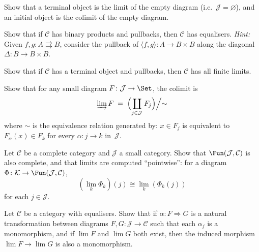 \begin{exercise}\label{exer:terminal-limit}
Show that a terminal object is the limit of the empty diagram
(i.e.\ $\mathcal{J} = \varnothing$), and an initial object is the
colimit of the empty diagram.
\end{exercise}

\begin{exercise}\label{exer:equaliser-from-pullback}
Show that if $\mathcal{C}$ has binary products and pullbacks,
then $\mathcal{C}$ has equalisers.
\emph{Hint:} Given $f,g\colon A\rightrightarrows B$, consider the
pullback of $\langle f,g\rangle\colon A\to B\times B$ along
the diagonal $\Delta\colon B\to B\times B$.
\end{exercise}

\begin{exercise}\label{exer:product-from-pullback}
Show that if $\mathcal{C}$ has a terminal object and pullbacks,
then $\mathcal{C}$ has all finite limits.
\end{exercise}

\begin{exercise}\label{exer:colimit-in-set}
Show that for any small diagram $F\colon\mathcal{J}\to\Set$,
the colimit is
\[
    \varinjlim F \;=\;
    \Bigl(\coprod_{j\in\mathcal{J}} F_j\Bigr)\Big/{\sim}
\]
where $\sim$ is the equivalence relation generated by:
$x\in F_j$ is equivalent to $F_\alpha(x)\in F_k$ for every
$\alpha\colon j\to k$ in~$\mathcal{J}$.
\end{exercise}

\begin{exercise}\label{exer:limit-functor-category}
Let $\mathcal{C}$ be a complete category and $\mathcal{J}$ a small category.
Show that $\Fun(\mathcal{J},\mathcal{C})$ is also complete,
and that limits are computed ``pointwise'': for a diagram
$\Phi\colon\mathcal{K}\to\Fun(\mathcal{J},\mathcal{C})$,
\[
    (\lim_k \Phi_k)(j) \cong \lim_k(\Phi_k(j))
\]
for each $j\in\mathcal{J}$.
\end{exercise}

\begin{exercise}\label{exer:limit-preserves-mono}
Let $\mathcal{C}$ be a category with equalisers.
Show that if $\alpha\colon F\Rightarrow G$ is a natural transformation
between diagrams $F,G\colon\mathcal{J}\to\mathcal{C}$ such that each
$\alpha_j$ is a monomorphism, and if $\lim F$ and $\lim G$ both exist,
then the induced morphism $\lim F\to\lim G$ is also a monomorphism.
\end{exercise}

